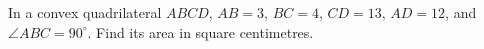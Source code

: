 In a convex quadrilateral $ABCD$, $AB=3$, $BC=4$, $CD=13$, $AD=12$, and $\angle ABC=90^\circ$. Find its area in square centimetres.
